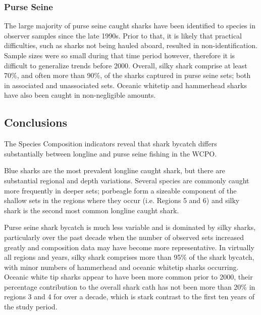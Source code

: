 \documentclass[12pt]{SCreport}
\begin{document}
  
 \subsubsection{Purse Seine} 
The large majority of purse seine caught sharks have been identified to species in observer samples since the late 1990s.  Prior to that, it is likely that practical difficulties, such as sharks not being hauled aboard, resulted in non-identification.  Sample sizes were so small during that time period however, therefore it is difficult to generalize trends before 2000.  Overall, silky shark comprise at least 70\%, and often more than 90\%, of the sharks captured in purse seine sets; both in associated and unassociated sets.  Oceanic whitetip and hammerhead sharks have also been caught in non-negligible amounts.

 
 \subsection{Conclusions}

The Species Composition indicators reveal that shark bycatch differs substantially between longline and purse seine fishing in the WCPO.  

Blue sharks are the most prevalent longline caught shark, but there are substantial regional and depth variations.  Several species are commonly caught more frequently in deeper sets; porbeagle form a sizeable component of the shallow sets in the regions where they occur (i.e. Regions 5 and 6) and silky shark is the second most common longline caught shark.

Purse seine shark bycatch is much less variable and is dominated by silky sharks, particularly over the past decade when the number of observed sets increased greatly and composition data may have become more representative.  In virtually all regions and years, silky shark comprises more than 95\% of the shark bycatch, with minor numbers of hammerhead and oceanic whitetip sharks occurring.  Oceanic white tip sharks appear to have been more common prior to 2000, their percentage contribution to the overall shark cath has not been more than 20\% in regions 3 and 4 for over a decade, which is stark contrast to the first ten years of the study period. 

 \clearpage          

\end{document}
